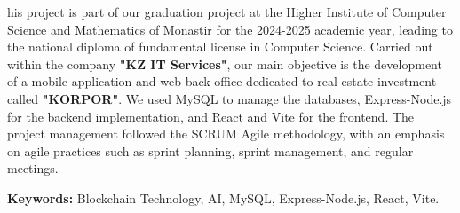 \noindent {}his project is part of our graduation project at the Higher Institute of Computer Science and Mathematics of Monastir for the 2024-2025 academic year, leading to the national diploma of fundamental license in Computer Science.
Carried out within the company \textbf{\textcolor{primary}{"KZ IT Services"}}, our main objective is the development of a mobile application and web back office dedicated to real estate investment called \textbf{\textcolor{primary}{"KORPOR"}}. We used MySQL to manage the databases, Express-Node.js for the backend implementation, and React and Vite for the frontend.
The project management followed the SCRUM Agile methodology, with an emphasis on agile practices such as sprint planning, sprint management, and regular meetings.

\vspace{0.3cm}
\begin{tcolorbox}[
    colback=background,
    colframe=primary,
    arc=1mm,
    boxrule=0.5pt,
    left=8pt,
    right=8pt,
    top=4pt,
    bottom=4pt,
    width=\textwidth
]
\textbf{Keywords:} Blockchain Technology, AI, MySQL, Express-Node.js, React, Vite.
\end{tcolorbox}

\nopagebreak 